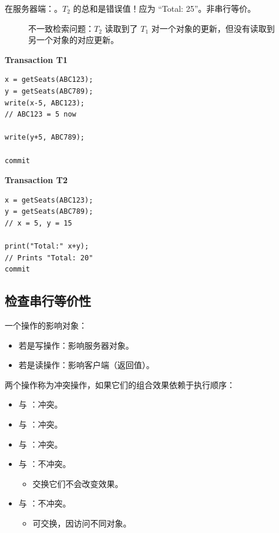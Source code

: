 在服务器端：。$T_2$ 的总和是错误值！应为 ``Total: 25''。非串行等价。

\begin{figure}[H]
  \centering
  \caption{不一致检索问题：$T_2$ 读取到了 $T_1$ 对一个对象的更新，但没有读取到另一个对象的对应更新。}
\end{figure}

\begin{minipage}[t]{0.47\textwidth}
\textbf{Transaction T1}
\begin{verbatim}
x = getSeats(ABC123);
y = getSeats(ABC789);
write(x-5, ABC123);
// ABC123 = 5 now

write(y+5, ABC789);

commit
\end{verbatim}
\end{minipage}\hfill
\begin{minipage}[t]{0.47\textwidth}
\textbf{Transaction T2}
\begin{verbatim}
x = getSeats(ABC123);
y = getSeats(ABC789);
// x = 5, y = 15

print("Total:" x+y);
// Prints "Total: 20"
commit
\end{verbatim}
\end{minipage}

\subsection{检查串行等价性}

一个操作的影响对象：

\begin{itemize}
  \item 若是写操作：影响服务器对象。
  \item 若是读操作：影响客户端（返回值）。
\end{itemize}

两个操作称为冲突操作，如果它们的组合效果依赖于执行顺序：

\begin{itemize}
  \item {} 与 ：冲突。
  \item {} 与 ：冲突。
  \item {} 与 ：冲突。
  \item {} 与 ：不冲突。
  \begin{itemize}
    \item 交换它们不会改变效果。
  \end{itemize}
  \item {} 与 ：不冲突。
  \begin{itemize}
    \item 可交换，因访问不同对象。
  \end{itemize}
\end{itemize}

